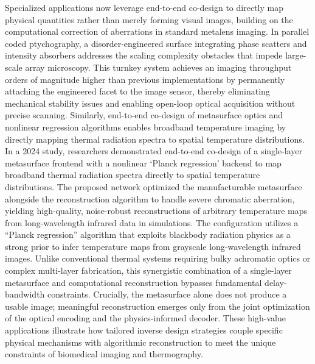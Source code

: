 \documentclass[11pt]{article}
\begin{document}
Specialized applications now leverage end-to-end co-design to directly map physical quantities rather than merely forming visual images, building on the computational correction of aberrations in standard metalens imaging. In parallel coded ptychography, a disorder-engineered surface integrating phase scatters and intensity absorbers addresses the scaling complexity obstacles that impede large-scale array microscopy. This turnkey system achieves an imaging throughput orders of magnitude higher than previous implementations by permanently attaching the engineered facet to the image sensor, thereby eliminating mechanical stability issues and enabling open-loop optical acquisition without precise scanning. Similarly, end-to-end co-design of metasurface optics and nonlinear regression algorithms enables broadband temperature imaging by directly mapping thermal radiation spectra to spatial temperature distributions. In a 2024 study, researchers demonstrated end-to-end co-design of a single-layer metasurface frontend with a nonlinear `Planck regression' backend to map broadband thermal radiation spectra directly to spatial temperature distributions. The proposed network optimized the manufacturable metasurface alongside the reconstruction algorithm to handle severe chromatic aberration, yielding high-quality, noise-robust reconstructions of arbitrary temperature maps from long-wavelength infrared data in simulations. \citep{doi_10_1002_adom_202402498_4083d234} The configuration utilizes a ``Planck regression'' algorithm that exploits blackbody radiation physics as a strong prior to infer temperature maps from grayscale long-wavelength infrared images. Unlike conventional thermal systems requiring bulky achromatic optics or complex multi-layer fabrication, this synergistic combination of a single-layer metasurface and computational reconstruction bypasses fundamental delay-bandwidth constraints. Crucially, the metasurface alone does not produce a usable image; meaningful reconstruction emerges only from the joint optimization of the optical encoding and the physics-informed decoder. These high-value applications illustrate how tailored inverse design strategies couple specific physical mechanisms with algorithmic reconstruction to meet the unique constraints of biomedical imaging and thermography. \citep{doi_10_1021_acsphotonics_1c01085_479fdea3} \citep{doi_10_1002_adom_202402498_4083d234}
\end{document}
